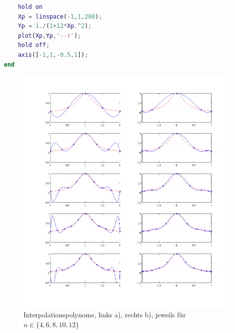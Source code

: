 \documentclass[a4paper]{scrartcl}
\begin{document}
\begin{aufgabe}
\begin{lstlisting}[language=matlab]
    % Funktion f(x)
    hold on
    Xp = linspace(-1,1,200);
    Yp = 1./(1+12*Xp.^2);
    plot(Xp,Yp,'--r');   
    hold off;
    axis([-1,1,-0.5,1]);
end
	\end{lstlisting}
		\begin{figure}[h]
			\centering
			\caption{Interpolationspolynome, links a), rechts b), jeweils für $n\in\{4,6,8,10,12\}$}
			\includegraphics[scale=0.6]{num1_1_4}
		\end{figure}
\end{aufgabe}
\end{document}
